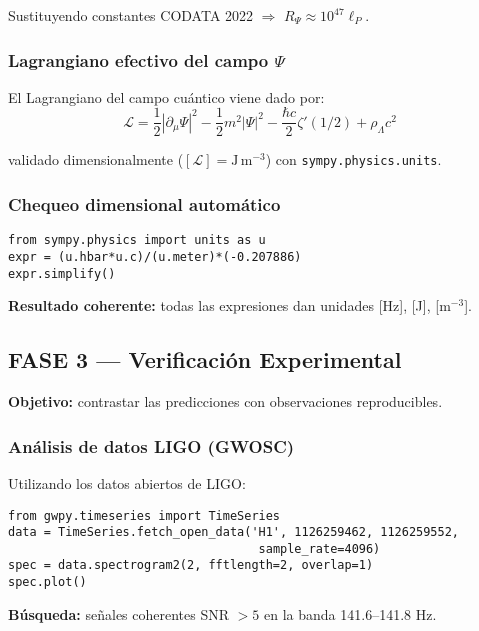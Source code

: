 Sustituyendo constantes CODATA 2022 $\Rightarrow$ $R_\Psi \approx 10^{47} \ell_P$.

\subsubsection{Lagrangiano efectivo del campo $\Psi$}

El Lagrangiano del campo cuántico viene dado por:
\begin{equation}\label{eq:lagrangian-psi-v2}
\mathcal{L} = \frac{1}{2}|\partial_\mu \Psi|^2 - \frac{1}{2}m^2|\Psi|^2 - \frac{\hbar c}{2}\zeta'(1/2) + \rho_\Lambda c^2
\end{equation}

validado dimensionalmente ($[\mathcal{L}] = \text{J}\,\text{m}^{-3}$) con \texttt{sympy.physics.units}.

\subsubsection{Chequeo dimensional automático}

\begin{verbatim}
from sympy.physics import units as u
expr = (u.hbar*u.c)/(u.meter)*(-0.207886)
expr.simplify()
\end{verbatim}

\textbf{Resultado coherente:} todas las expresiones dan unidades [Hz], [J], [m$^{-3}$].

\subsection{FASE 3 — Verificación Experimental}

\textbf{Objetivo:} contrastar las predicciones con observaciones reproducibles.

\subsubsection{Análisis de datos LIGO (GWOSC)}

Utilizando los datos abiertos de LIGO:

\begin{verbatim}
from gwpy.timeseries import TimeSeries
data = TimeSeries.fetch_open_data('H1', 1126259462, 1126259552, 
                                   sample_rate=4096)
spec = data.spectrogram2(2, fftlength=2, overlap=1)
spec.plot()
\end{verbatim}

\textbf{Búsqueda:} señales coherentes SNR $> 5$ en la banda 141.6--141.8 Hz.

